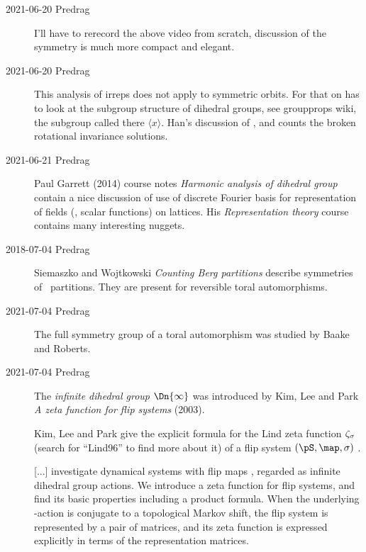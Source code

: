 \begin{description}
\item[2021-06-20 Predrag]
I'll have to rerecord the above video from scratch, 
discussion of the  symmetry is much more compact and elegant.

\item[2021-06-20 Predrag]
This analysis of \Dn{\cl{}} irreps does not apply to symmetric orbits. For
that on has to look at the subgroup structure of dihedral groups, see
{groupprops wiki}, the subgroup called there $\langle x \rangle$. Han's
discussion of ,  and
 counts the broken rotational invariance solutions.

\item[2021-06-21 Predrag]
 {Paul Garrett} (2014) course notes
{{\em Harmonic analysis of dihedral group}}
contain a nice discussion of use of discrete Fourier basis for representation
of fields (\ie, scalar functions) on \Dn{\cl{}} lattices.
His 
{{\em Representation theory}} course contains many interesting nuggets.

\item[2018-07-04 Predrag] %
Siemaszko and Wojtkowski {\em Counting {Berg} partitions} describe
symmetries of \AW\ partitions. They are present for reversible toral
automorphisms.

\item[2021-07-04 Predrag]
The full symmetry group of a toral automorphism was studied by
Baake and Roberts.

\item[2021-07-04 Predrag]
The \emph{infinite dihedral group} $\Dn{\infty}$  was
introduced by Kim, Lee and Park {\em A zeta function for flip
systems} (2003).

Kim, Lee and Park give the explicit formula 
for the Lind zeta function $\zeta_{\sigma}$ (search for ``Lind96''
to find more about it) of a flip system $(\pS,\map,\Refl)$
.

[...]
investigate dynamical systems with flip maps , regarded as
infinite dihedral group actions. We introduce a zeta function for flip
systems, and find its basic properties including a product formula. When the
underlying -action is conjugate to a topological Markov shift, the flip
system is represented by a pair of matrices, and its zeta function is
expressed explicitly in terms of the representation matrices.


\end{description}
